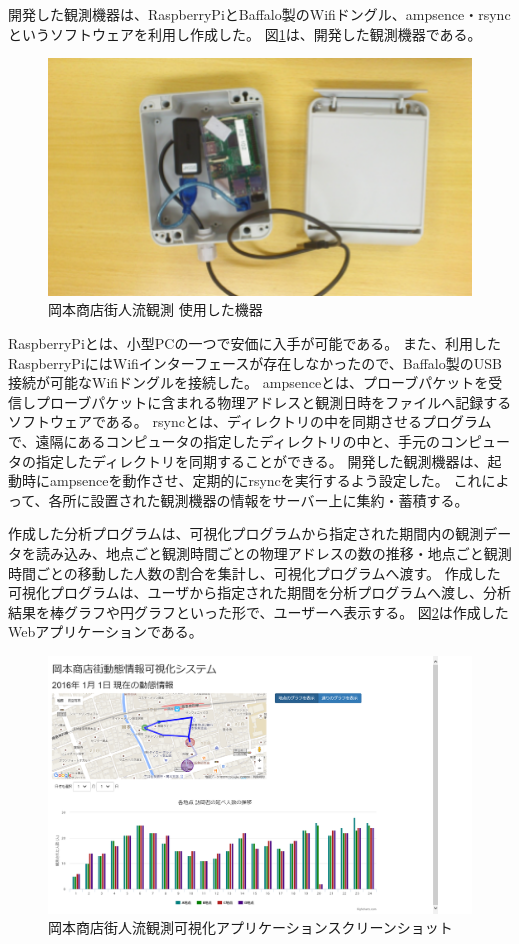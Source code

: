 開発した観測機器は、RaspberryPiとBaffalo製のWifiドングル、ampsence・rsyncというソフトウェアを利用し作成した。
図\ref{fig:okamoto_pict1}は、開発した観測機器である。
\begin{figure}[htbp]
\includegraphics[width=16cm]{images/okamoto_pict1.png}
\caption{岡本商店街人流観測 使用した機器}
\label{fig:okamoto_pict1}
\end{figure}
RaspberryPiとは、小型PCの一つで安価に入手が可能である。
また、利用したRaspberryPiにはWifiインターフェースが存在しなかったので、Baffalo製のUSB接続が可能なWifiドングルを接続した。
ampsenceとは、プローブパケットを受信しプローブパケットに含まれる物理アドレスと観測日時をファイルへ記録するソフトウェアである。
rsyncとは、ディレクトリの中を同期させるプログラムで、遠隔にあるコンピュータの指定したディレクトリの中と、手元のコンピュータの指定したディレクトリを同期することができる。
開発した観測機器は、起動時にampsenceを動作させ、定期的にrsyncを実行するよう設定した。
これによって、各所に設置された観測機器の情報をサーバー上に集約・蓄積する。

作成した分析プログラムは、可視化プログラムから指定された期間内の観測データを読み込み、地点ごと観測時間ごとの物理アドレスの数の推移・地点ごと観測時間ごとの移動した人数の割合を集計し、可視化プログラムへ渡す。
作成した可視化プログラムは、ユーザから指定された期間を分析プログラムへ渡し、分析結果を棒グラフや円グラフといった形で、ユーザーへ表示する。
図\ref{fig:okamoto_ss}は作成したWebアプリケーションである。
\begin{figure}[htbp]
\includegraphics[width=16cm]{images/okamoto_scr1.png}
\caption{岡本商店街人流観測可視化アプリケーションスクリーンショット}
\label{fig:okamoto_ss}
\end{figure}


